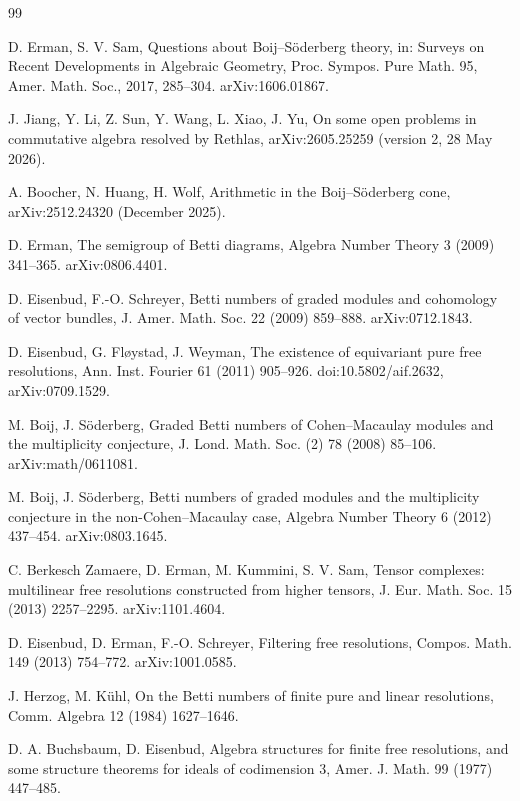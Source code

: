 \documentclass[11pt]{article}
\theoremstyle{definition}
\theoremstyle{remark}
\begin{document}
\begin{thebibliography}{99}\small

 D. Erman, S. V. Sam, Questions about Boij--S\"oderberg theory, in: Surveys on Recent Developments in Algebraic Geometry, Proc. Sympos. Pure Math. 95, Amer. Math. Soc., 2017, 285--304. arXiv:1606.01867.

 J. Jiang, Y. Li, Z. Sun, Y. Wang, L. Xiao, J. Yu, On some open problems in commutative algebra resolved by Rethlas, arXiv:2605.25259 (version 2, 28 May 2026).

 A. Boocher, N. Huang, H. Wolf, Arithmetic in the Boij--S\"oderberg cone, arXiv:2512.24320 (December 2025).

 D. Erman, The semigroup of Betti diagrams, Algebra Number Theory 3 (2009) 341--365. arXiv:0806.4401.

 D. Eisenbud, F.-O. Schreyer, Betti numbers of graded modules and cohomology of vector bundles, J. Amer. Math. Soc. 22 (2009) 859--888. arXiv:0712.1843.

 D. Eisenbud, G. Fl{\o}ystad, J. Weyman, The existence of equivariant pure free resolutions, Ann. Inst. Fourier 61 (2011) 905--926. doi:10.5802/aif.2632, arXiv:0709.1529.

 M. Boij, J. S\"oderberg, Graded Betti numbers of Cohen--Macaulay modules and the multiplicity conjecture, J. Lond. Math. Soc. (2) 78 (2008) 85--106. arXiv:math/0611081.

 M. Boij, J. S\"oderberg, Betti numbers of graded modules and the multiplicity conjecture in the non-Cohen--Macaulay case, Algebra Number Theory 6 (2012) 437--454. arXiv:0803.1645.

 C. Berkesch Zamaere, D. Erman, M. Kummini, S. V. Sam, Tensor complexes: multilinear free resolutions constructed from higher tensors, J. Eur. Math. Soc. 15 (2013) 2257--2295. arXiv:1101.4604.

 D. Eisenbud, D. Erman, F.-O. Schreyer, Filtering free resolutions, Compos. Math. 149 (2013) 754--772. arXiv:1001.0585.

 J. Herzog, M. K\"uhl, On the Betti numbers of finite pure and linear resolutions, Comm. Algebra 12 (1984) 1627--1646.

 D. A. Buchsbaum, D. Eisenbud, Algebra structures for finite free resolutions, and some structure theorems for ideals of codimension 3, Amer. J. Math. 99 (1977) 447--485.


\end{thebibliography}
\end{document}
